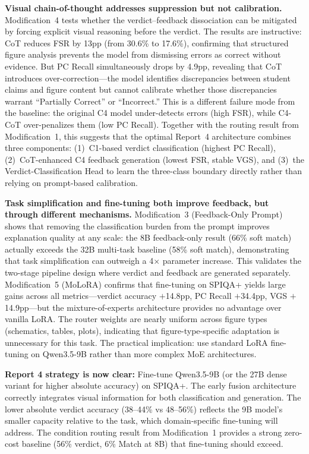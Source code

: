 \documentclass{article}
\begin{document}
\textbf{Visual chain-of-thought addresses suppression but not calibration.}
Modification~4 tests whether the verdict--feedback dissociation can be mitigated
by forcing explicit visual reasoning before the verdict. The results are instructive:
CoT reduces FSR by 13pp (from 30.6\% to 17.6\%), confirming that structured figure
analysis prevents the model from dismissing errors as correct without evidence.
But PC Recall simultaneously drops by 4.9pp, revealing that CoT introduces
over-correction---the model identifies discrepancies between student claims and
figure content but cannot calibrate whether those discrepancies warrant ``Partially
Correct'' or ``Incorrect.'' This is a different failure mode from the baseline:
the original C4 model under-detects errors (high FSR), while C4-CoT over-penalizes
them (low PC Recall). Together with the routing result from Modification~1, this
suggests that the optimal Report~4 architecture combines three components:
(1)~C1-based verdict classification (highest PC Recall), (2)~CoT-enhanced C4
feedback generation (lowest FSR, stable VGS), and (3)~the Verdict-Classification
Head to learn the three-class boundary directly rather than relying on prompt-based
calibration.

\textbf{Task simplification and fine-tuning both improve feedback, but through
different mechanisms.} Modification~3 (Feedback-Only Prompt) shows that removing
the classification burden from the prompt improves explanation quality at any scale:
the 8B feedback-only result (66\% soft match) actually exceeds the 32B multi-task
baseline (58\% soft match), demonstrating that task simplification can outweigh a
4$\times$ parameter increase. This validates the two-stage pipeline design where
verdict and feedback are generated separately. Modification~5 (MoLoRA) confirms that
fine-tuning on SPIQA+ yields large gains across all metrics---verdict accuracy
$+$14.8pp, PC Recall $+$34.4pp, VGS $+$14.9pp---but the mixture-of-experts architecture
provides no advantage over vanilla LoRA. The router weights are nearly uniform across
figure types (schematics, tables, plots), indicating that figure-type-specific
adaptation is unnecessary for this task. The practical implication: use standard LoRA
fine-tuning on Qwen3.5-9B rather than more complex MoE architectures.

\textbf{Report 4 strategy is now clear:} Fine-tune Qwen3.5-9B (or the 27B dense
variant for higher absolute accuracy) on SPIQA+. The early fusion architecture
correctly integrates visual information for both classification and generation.
The lower absolute verdict accuracy (38--44\% vs 48--56\%) reflects the 9B model's
smaller capacity relative to the task, which domain-specific fine-tuning will address.
The condition routing result from Modification~1 provides a strong zero-cost baseline
(56\% verdict, 6\% Match at 8B) that fine-tuning should exceed.
\end{document}
